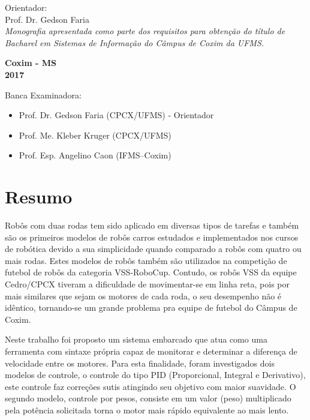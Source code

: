 \documentclass[a4paper,12pt,portuguese]{ufms-cpcx}
\begin{document}
\hspace{5.5cm}
\begin{minipage}{10cm}
			{Orientador:\\Prof. Dr. Gedson Faria}\\
			
			\textit{Monografia apresentada como parte dos requisitos para obtenção do título de Bacharel em Sistemas de Informação do Câmpus de Coxim da UFMS.}
\end{minipage}	

\begin{center}
	\vspace{10cm}
	\textbf{Coxim - MS\\ 2017}	
\end{center}


\cleardoublepage
\thispagestyle{empty}
\vspace*{15cm}
Banca Examinadora:
\begin{itemize}
	\item Prof. Dr.  Gedson Faria (CPCX/UFMS) - Orientador
	\item Prof. Me.  Kleber Kruger (CPCX/UFMS) 
	\item Prof. Esp. Angelino Caon (IFMS--Coxim)
\end{itemize}


\chapter*{Resumo}
\thispagestyle{empty}
Robôs com duas rodas tem sido aplicado em diversas tipos de tarefas e também são os primeiros modelos de robôs carros estudados e implementados nos cursos de robótica devido a sua simplicidade quando comparado a robôs com quatro ou mais rodas. Estes modelos de robôs também são utilizados na competição de futebol de robôs da categoria VSS-RoboCup. Contudo, os robôs VSS da equipe Cedro/CPCX tiveram a dificuldade de movimentar-se em linha reta, pois por mais similares que sejam os motores de cada roda, o seu desempenho não é idêntico, tornando-se um grande problema pra equipe de futebol do Câmpus de Coxim.

Neste trabalho foi proposto um sistema embarcado que atua como uma ferramenta com sintaxe própria capaz de monitorar e determinar a diferença de velocidade entre os motores. 
Para esta finalidade, foram investigados dois modelos de controle, o controle do tipo PID (Proporcional, Integral e Derivativo), este controle faz correções sutis atingindo seu objetivo com maior suavidade. O segundo modelo, controle por pesos, consiste em um valor (peso) multiplicado pela potência solicitada torna o motor mais rápido equivalente ao mais lento.
\end{document}
